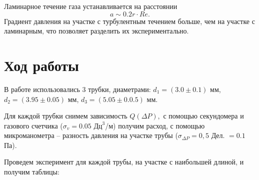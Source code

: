 \documentclass[a4paper, 12pt]{article}
\begin{document}
	Ламинарное течение газа устанавливается на расстоянии
	\begin{equation}
		a \sim 0.2 r \cdot Re.
		\label{eq:Aa}
	\end{equation}
	Градиент давления на участке с турбулентным течением больше, чем на участке с ламинарным, что позволяет разделить их экспериментально.
	
	\section{Ход работы}
	
	В работе использовались 3 трубки, диаметрами: $d_1 = (3.0\pm0.1)$ мм, $d_2 = (3.95\pm0.05)$ мм, $d_3 = (5.05\pm0.0.5)$ мм.
	
	Для каждой трубки снимем зависимость $Q(\Delta P),$ с помощью секундомера и газового счетчика ($\sigma_v = 0.05\text{ Дц}^3$/м) получим расход, с помощью микроманометра -- разность давления на участке трубы ($\sigma_{\Delta P} = 0,5$ Дел. $ = 0.1$ Па).
\vspace{100pt}

	Проведем эксперимент для каждой трубы, на участке с наибольшей длиной, и получим таблицы:
	
\end{document}
